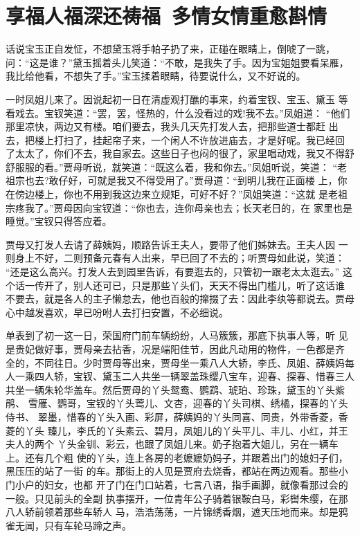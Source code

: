 \chapter{享福人福深还祷福~多情女情重愈斟情}

话说宝玉正自发怔，不想黛玉将手帕子扔了来，正碰在眼睛上，倒唬了一跳，
问：“这是谁？”黛玉摇着头儿笑道：“不敢，是我失了手。因为宝姐姐要看呆雁，
我比给他看，不想失了手。”宝玉揉着眼睛，待要说什么，又不好说的。

一时凤姐儿来了。因说起初一日在清虚观打醮的事来，约着宝钗、宝玉、黛玉
等看戏去。宝钗笑道：“罢，罢，怪热的，什么没看过的戏!我不去。”凤姐道：
“他们那里凉快，两边又有楼。咱们要去，我头几天先打发人去，把那些道士都赶
出去，把楼上打扫了，挂起帘子来，一个闲人不许放进庙去，才是好呢。我已经回
了太太了，你们不去，我自家去。这些日子也闷的很了，家里唱动戏，我又不得舒
舒服服的看。”贾母听说，就笑道：“既这么着，我和你去。”凤姐听说，笑道：
“老祖宗也去?敢仔好，可就是我又不得受用了。”贾母道：“到明儿我在正面楼
上，你在傍边楼上，你也不用到我这边来立规矩，可好不好？”凤姐笑道：“这就
是老祖宗疼我了。”贾母因向宝钗道：“你也去，连你母亲也去；长天老日的，在
家里也是睡觉。”宝钗只得答应着。

贾母又打发人去请了薛姨妈，顺路告诉王夫人，要带了他们姊妹去。王夫人因
一则身上不好，二则预备元春有人出来，早已回了不去的；听贾母如此说，笑道：
“还是这么高兴。打发人去到园里告诉，有要逛去的，只管初一跟老太太逛去。”
这个话一传开了，别人还可已，只是那些丫头们，天天不得出门槛儿，听了这话谁
不要去，就是各人的主子懒怠去，他也百般的撺掇了去：因此李纨等都说去。贾母
心中越发喜欢，早已吩咐人去打扫安置，不必细说。

单表到了初一这一日，荣国府门前车辆纷纷，人马簇簇，那底下执事人等，听
见是贵妃做好事，贾母亲去拈香，况是端阳佳节，因此凡动用的物件，一色都是齐
全的，不同往日。少时贾母等出来，贾母坐一乘八人大轿，李氏、凤姐、薛姨妈每
人一乘四人轿，宝钗、黛玉二人共坐一辆翠盖珠缨八宝车，迎春、探春、惜春三人
共坐一辆朱轮华盖车。然后贾母的丫头鸳鸯、鹦鹉、琥珀、珍珠，黛玉的丫头紫鹃、
雪雁、鹦哥，宝钗的丫头莺儿、文杏，迎春的丫头司棋、绣橘，探春的丫头侍书、
翠墨，惜春的丫头入画、彩屏，薛姨妈的丫头同喜、同贵，外带香菱，香菱的丫头
臻儿，李氏的丫头素云、碧月，凤姐儿的丫头平儿、丰儿、小红，并王夫人的两个
丫头金钏、彩云，也跟了凤姐儿来。奶子抱着大姐儿，另在一辆车上。还有几个粗
使的丫头，连上各房的老嬷嬷奶妈子，并跟着出门的媳妇子们，黑压压的站了一街
的车。那街上的人见是贾府去烧香，都站在两边观看。那些小门小户的妇女，也都
开了门在门口站着，七言八语，指手画脚，就像看那过会的一般。只见前头的全副
执事摆开，一位青年公子骑着银鞍白马，彩辔朱缨，在那八人轿前领着那些车轿人
马，浩浩荡荡，一片锦绣香烟，遮天压地而来。却是鸦雀无闻，只有车轮马蹄之声。

